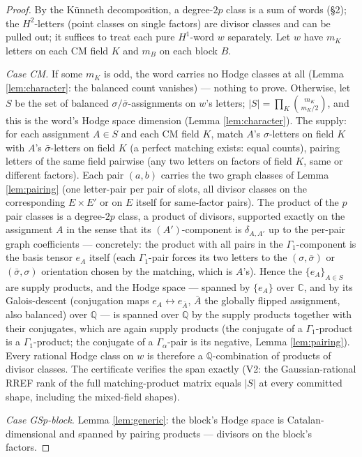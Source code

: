 \documentclass[11pt]{article}
\newcommand{\Q}{\mathbb{Q}}
\newcommand{\C}{\mathbb{C}}
\begin{document}
\begin{proof}
By the K\"unneth decomposition, a degree-$2p$ class is a sum of words
(\S2); the $H^2$-letters (point classes on single factors) are divisor
classes and can be pulled out; it suffices to treat each pure
$H^1$-word $w$ separately. Let $w$ have $m_K$ letters on each CM field
$K$ and $m_B$ on each block $B$.

\emph{Case CM.} If some $m_K$ is odd, the word carries no Hodge classes
at all (Lemma \ref{lem:character}: the balanced count vanishes) ---
nothing to prove. Otherwise, let $S$ be the set of balanced
$\sigma/\bar\sigma$-assignments on $w$'s letters;
$|S|=\prod_K\binom{m_K}{m_K/2}$, and this is the word's Hodge space
dimension (Lemma \ref{lem:character}). The supply: for each assignment
$A\in S$ and each CM field $K$, match $A$'s $\sigma$-letters on field
$K$ with $A$'s $\bar\sigma$-letters on field $K$ (a perfect matching
exists: equal counts), pairing letters of the same field pairwise (any
two letters on factors of field $K$, same or different factors). Each
pair $(a,b)$ carries the two graph classes of Lemma \ref{lem:pairing}
(one letter-pair per pair of slots, all divisor classes on the
corresponding $E\times E'$ or on $E$ itself for same-factor pairs).
The product of the $p$ pair classes is a degree-$2p$ class, a product of
divisors, supported exactly on the assignment $A$ in the sense that its
$(A')$-component is $\delta_{A,A'}$ up to the per-pair graph
coefficients --- concretely: the product with all pairs in the
$\Gamma_1$-component is the basis tensor $e_A$ itself (each
$\Gamma_1$-pair forces its two letters to the $(\sigma,\bar\sigma)$ or
$(\bar\sigma,\sigma)$ orientation chosen by the matching, which is
$A$'s). Hence the $\{e_A\}_{A\in S}$ are supply products, and the Hodge
space --- spanned by $\{e_A\}$ over $\C$, and by its
Galois-descent (conjugation maps $e_A\leftrightarrow e_{\bar A}$,
$\bar A$ the globally flipped assignment, also balanced) over $\Q$ ---
is spanned over $\Q$ by the supply products together with their
conjugates, which are again supply products (the conjugate of a
$\Gamma_1$-product is a $\Gamma_1$-product; the conjugate of a
$\Gamma_\alpha$-pair is its negative, Lemma \ref{lem:pairing}). Every
rational Hodge class on $w$ is therefore a $\Q$-combination of products
of divisor classes. The certificate verifies the span exactly
(V2: the Gaussian-rational RREF rank of the full matching-product matrix
equals $|S|$ at every committed shape, including the mixed-field
shapes).

\emph{Case GSp-block.} Lemma \ref{lem:generic}: the block's Hodge space
is Catalan-dimensional and spanned by pairing products --- divisors on
the block's factors.


\end{proof}
\end{document}
